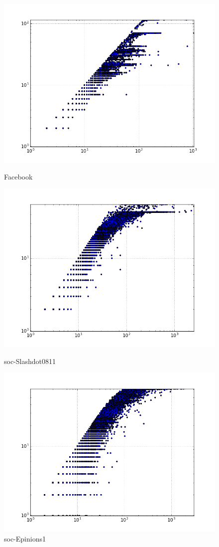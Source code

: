 \begin{figure}[H]
  \includegraphics[width=\linewidth]{img/facebook/degreeVSkcore.png}
  \caption*{Facebook}
\endminipage\hfill
{}
  \includegraphics[width=\linewidth]{img/slashDot/degreeVSkcore.png}
  \caption*{soc-Slashdot0811}
\endminipage\hfill
{}
  \includegraphics[width=\linewidth]{img/soc-E/degreeVSkcore.png}
  \caption*{soc-Epinions1}
\endminipage
\end{figure}
